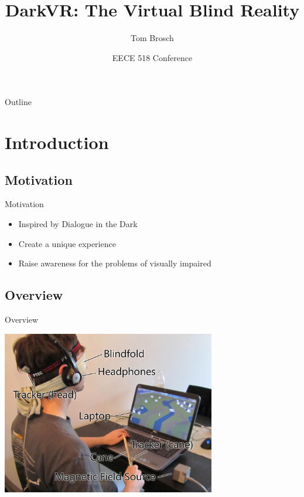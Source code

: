 \documentclass{beamer}
\title{DarkVR: The Virtual Blind Reality}
\author{Tom Brosch}
\institute[Universities of British Columbia]
{
Electrical and Computer Engineering\\
University of British Columbia
}
\date{EECE 518 Conference}
\begin{document}
\begin{frame}
\titlepage
\end{frame}

\begin{frame}{Outline}
\tableofcontents
\end{frame}


\section{Introduction}

\subsection{Motivation}

\begin{frame}{Motivation}

\begin{itemize}
  \item Inspired by Dialogue in the Dark
  \item Create a unique experience
  \item Raise awareness for the problems of visually impaired
\end{itemize}

\end{frame}


\subsection{Overview}

\begin{frame}{Overview}

\begin{center}
\includegraphics[width=0.7\textwidth]{images/details2}
\end{center}

\end{frame}
\end{document}
